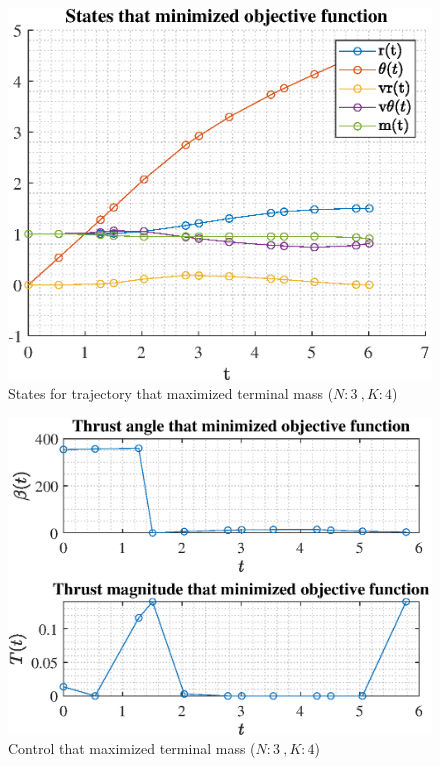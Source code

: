\documentclass[]{article}
\begin{document}
\begin{figure}
	\centering
	\includegraphics[scale=0.75]{states_N3_K4_C3_mf.eps}
	\caption{States for trajectory that maximized terminal mass (\(N:3\ , K:4\))}
	\label{fig:states_N3_K4_C3_mf}
\end{figure}
\begin{figure}
	\centering
	\includegraphics[scale=0.75]{control_N3_K4_C3_mf.eps}
	\caption{Control that maximized terminal mass (\(N:3\ , K:4\))}
	\label{fig:control_N3_K4_C3_mf}
\end{figure}
\end{document}
